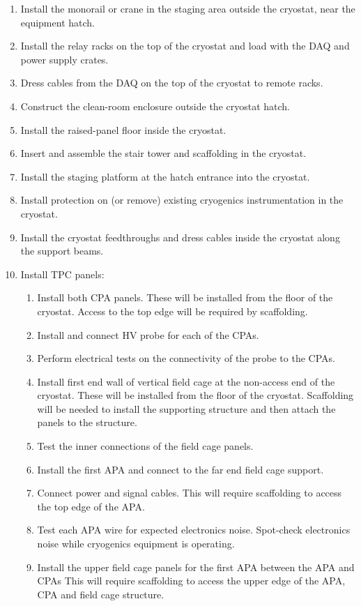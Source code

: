 \begin{enumerate}
\item Install the monorail or crane in the staging area outside the cryostat, near the equipment hatch.
\item Install the relay racks on the top of the cryostat and load with the DAQ and power supply crates.
\item Dress cables from the DAQ on the top of the cryostat to remote racks.
\item Construct the clean-room enclosure outside the cryostat hatch.
\item Install the raised-panel floor inside the cryostat. 
\item Insert and assemble the stair tower and scaffolding in the cryostat.
\item Install the staging platform at the hatch entrance into the cryostat.
\item Install protection on (or remove) existing cryogenics instrumentation in the cryostat.
\item Install the cryostat feedthroughs and dress cables inside the cryostat along the support beams.
\item Install TPC panels:
   \begin{enumerate}
   \item Install both CPA panels.  These will be installed from the floor of the cryostat.  Access to the top edge will be required by scaffolding.  
   \item Install and connect HV probe for each of the CPAs.
   \item Perform electrical tests on the connectivity of the probe to the CPAs.
   \item Install first end wall of vertical field cage at the non-access end of the cryostat.  These will be installed from the floor of the cryostat.  Scaffolding will be needed to install the supporting structure and then attach the panels to the structure.  
   \item Test the inner connections of the field cage panels.
   \item Install the first APA and connect to the far end field cage support.
   \item Connect power and signal cables.  This will require scaffolding to access the top edge of the APA.
   \item Test each APA wire for expected electronics noise. Spot-check electronics noise while cryogenics equipment is operating.
   \item Install the upper field cage panels for the first APA between the APA and CPAs  This will require scaffolding to access the upper edge of the APA, CPA and field cage structure.

\end{enumerate}
\end{enumerate}
